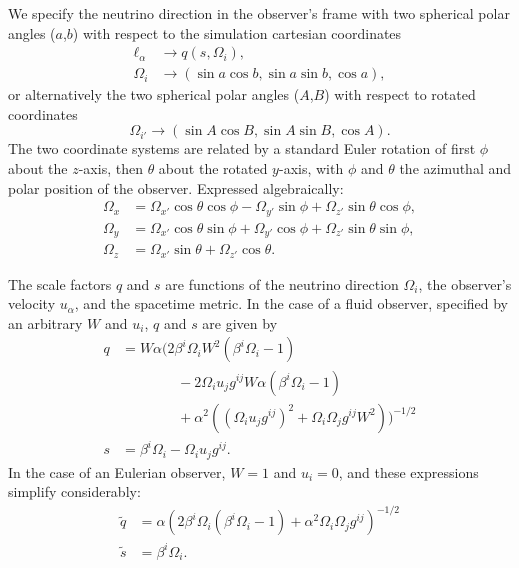 \documentclass[aps,floatfix,prd,superscriptaddress,twocolumn]{revtex4-1}
\begin{document}
We specify the neutrino direction in the observer's frame
with two spherical polar angles
($a$,$b$) with respect to the simulation cartesian coordinates
\begin{align}
  \ell_\alpha &\rightarrow q(s,\Omega_i), \\
  \Omega_i &\rightarrow (\sin a \cos b,\sin a\sin b,\cos a),
\end{align}
or alternatively the two spherical polar angles
($A$,$B$) with respect to rotated coordinates
\begin{equation}
  \label{eqn:def_direction_primed_2}
  \Omega_{i'} \rightarrow  (\sin A \cos B,\sin A\sin B,\cos A).
\end{equation}
The two coordinate systems are related by a standard Euler rotation of first
$\phi$ about the $z$-axis, then $\theta$ about the rotated $y$-axis,
with $\phi$ and $\theta$ the azimuthal and polar position of the observer.
Expressed algebraically:
\begin{align}
  \label{eqn:rotation_connection}
  \Omega_x &= \Omega_{x'}\cos\theta\cos\phi-\Omega_{y'}\sin\phi+\Omega_{z'}\sin\theta\cos\phi,\nonumber\\
  \Omega_y &= \Omega_{x'}\cos\theta\sin\phi+\Omega_{y'}\cos\phi+\Omega_{z'}\sin\theta\sin\phi,\nonumber\\
  \Omega_z &= \Omega_{x'}\sin\theta+\Omega_{z'}\cos\theta.
\end{align}

The scale factors $q$ and $s$ are functions of the neutrino
direction $\Omega_i$, the observer's velocity $u_\alpha$,
and the spacetime metric.
In the case of a fluid observer, specified by an arbitrary $W$ and $u_i$,
$q$ and $s$ are given by
\begin{align}
  \label{eqn:q_general}
  q
  &= W\alpha\Bigg(2\beta^i\Omega_i W^2(\beta^i\Omega_i-1) \nonumber\\
  &\qquad\qquad - 2\Omega_i u_j g^{ij} W \alpha(\beta^i\Omega_i-1)\nonumber\\
  &\qquad\qquad + \alpha^2\left((\Omega_i u_j g^{ij})^2+\Omega_i\Omega_j g^{ij}W^2\right)\Bigg)^{-1/2}\\
  \label{eqn:s_general}
  s
  &= \beta^i\Omega_i -\Omega_i u_j g^{ij}.
\end{align}
In the case of an Eulerian observer, $W=1$ and $u_i=0$,
and these expressions simplify considerably:
\begin{align}
  \label{eqn:q_eulerian}
  \tilde{q}
  &= \alpha\left(2\beta^i\Omega_i(\beta^i\Omega_i-1)+\alpha^2\Omega_i\Omega_j g^{ij}\right)^{-1/2}\\
  \label{eqn:s_eulerian}
  \tilde{s}
  &= \beta^i\Omega_i.
\end{align}
\end{document}

